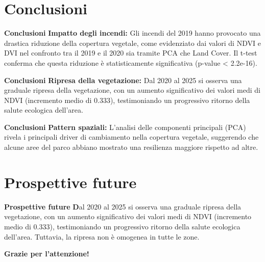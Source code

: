\documentclass{beamer}
\begin{document}
\section{Conclusioni}
\begin{frame}[fragile]{\textbf{Conclusioni}}
\textbf{Impatto degli incendi:} Gli incendi del 2019 hanno provocato una drastica riduzione della copertura vegetale, come evidenziato dai valori di NDVI e DVI nel confronto tra il 2019 e il 2020 sia tramite PCA che Land Cover. Il t-test conferma che questa riduzione è statisticamente significativa (p-value < 2.2e-16).
\end{frame}

\begin{frame}[fragile]{\textbf{Conclusioni}}
\textbf{Ripresa della vegetazione:} Dal 2020 al 2025 si osserva una graduale ripresa della vegetazione, con un aumento significativo dei valori medi di NDVI (incremento medio di 0.333), testimoniando un progressivo ritorno della salute ecologica dell'area.
\end{frame}

\begin{frame}[fragile]{\textbf{Conclusioni}}
\textbf{Pattern spaziali:} L’analisi delle componenti principali (PCA) rivela i principali driver di cambiamento nella copertura vegetale, suggerendo che alcune aree del parco abbiano mostrato una resilienza maggiore rispetto ad altre.
\end{frame}

\section{Prospettive future}
\begin{frame}[fragile]{\textbf{Prospettive future}}
\textbf Dal 2020 al 2025 si osserva una graduale ripresa della vegetazione, con un aumento significativo dei valori medi di NDVI (incremento medio di 0.333), testimoniando un progressivo ritorno della salute ecologica dell'area. Tuttavia, la ripresa non è omogenea in tutte le zone.     
\end{frame}

\begin{frame}{}
\centering
\textbf{Grazie per l'attenzione!}
\end{frame}
\end{document}
